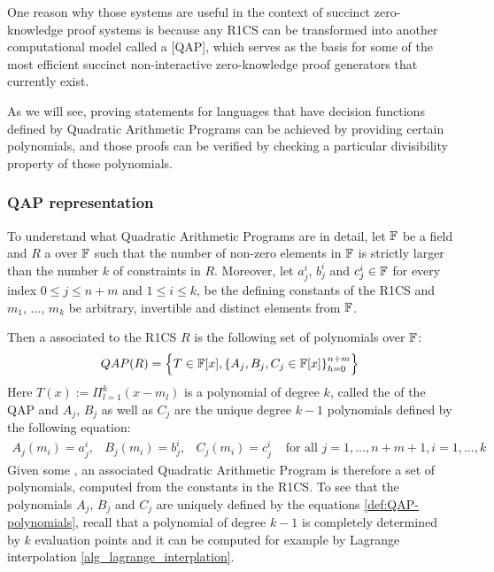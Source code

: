 One reason why those systems are useful in the context of succinct zero-knowledge proof systems is because any R1CS can be transformed into another computational model called a  [QAP], which serves as the basis for some of the most efficient succinct non-interactive zero-knowledge proof generators that currently exist. 

As we will see, proving statements for languages that have decision functions defined by Quadratic Arithmetic Programs can be achieved by providing certain polynomials, and those proofs can be verified by checking a particular divisibility property of those polynomials.
 
\subsubsection{QAP representation} To understand what Quadratic Arithmetic Programs are in detail, let $\mathbb{F}$ be a field and $R$ a  over $\mathbb{F}$ such that the number of non-zero elements in $\mathbb{F}$ is strictly larger than the number $k$ of constraints in $R$. Moreover, let $a_j^i$, $b_j^i$ and $c_j^i\in\mathbb{F}$ for every index $0\leq j \leq n+m$ and $1\leq i \leq k$, be the defining constants of the R1CS and $m_1$, $\ldots$, $m_k$ be arbitrary, invertible and distinct elements from $\mathbb{F}$.
  
Then a  associated to the R1CS $R$ is the following set of polynomials over $\mathbb{F}$:
\begin{equation}
\label{def:QAP-target-poly}
QAP(R) = \left\{T\in \mathbb{F}[x],\left\{A_j,B_j,C_j\in \mathbb{F}[x]\right\}_{h=0}^{n+m}\right\}
\end{equation}
Here $T(x) := \Pi_{l=1}^k (x- m_l)$ is a polynomial of degree $k$, called the  of the QAP and $A_j$, $B_j$ as well as $C_j$ are the unique degree $k-1$ polynomials defined by the following equation:
\begin{equation}
\label{def:QAP-polynomials}
\begin{array}{lllr}
A_j(m_i)=a_j^i, & B_j(m_i)=b_j^i, & C_j(m_i)=c_j^i & \text{ for all } j= 1, \ldots , n+m+1, i=1,\ldots,k 
\end{array}
\end{equation}
Given some , an associated Quadratic Arithmetic Program is therefore a set of polynomials, computed from the constants in the R1CS. To see that the polynomials $A_j$, $B_j$ and $C_j$ are uniquely defined by the equations \ref{def:QAP-polynomials}, recall that a polynomial of degree $k-1$ is completely determined by $k$ evaluation points and it can be computed for example by Lagrange interpolation \ref{alg_lagrange_interplation}.


